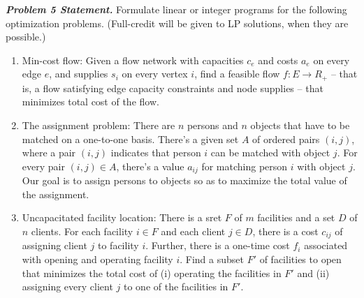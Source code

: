 \documentclass[10pt, letterpaper, twosided]{article}
\begin{document}
\emph{\textbf{Problem 5 Statement.}} Formulate linear or integer programs for the following optimization problems.
(Full-credit will be given to LP solutions, when they are possible.)
\begin{enumerate}[label=(\alph*)]
\item Min-cost flow:  Given a flow network with capacities $c_e$ and costs $a_e$ on every edge $e$, and supplies $s_i$
on every vertex $i$, find a feasible flow $f: E \rightarrow R_+$ -- that is, a flow satisfying edge capacity constraints and node supplies -- that minimizes total cost of the flow.
\item The assignment problem:  There are $n$ persons and $n$ objects that have to be matched on a one-to-one basis.
There's a given set $A$ of ordered pairs $(i,j)$, where a pair $(i,j)$ indicates that person $i$ can be matched with object
$j$.  For every pair $(i,j) \in A$, there's a value $a_{ij}$ for matching person $i$ with object $j$.  Our goal is to assign
persons to objects so as to maximize the total value of the assignment.
\item Uncapacitated facility location:  There is a sret $F$ of $m$ facilities and a set $D$ of $n$ clients.  For each facility
$i \in F$ and each client $j \in D$, there is a cost $c_{ij}$ of assigning client $j$ to facility $i$.  Further, there is a one-time cost $f_i$ associated with opening and operating facility $i$.  Find a subset $F'$ of facilities to open that minimizes the total cost of (i) operating the facilities in $F'$ and (ii) assigning every client $j$ to one of the facilities in $F'$.
\end{enumerate}
\end{document}
